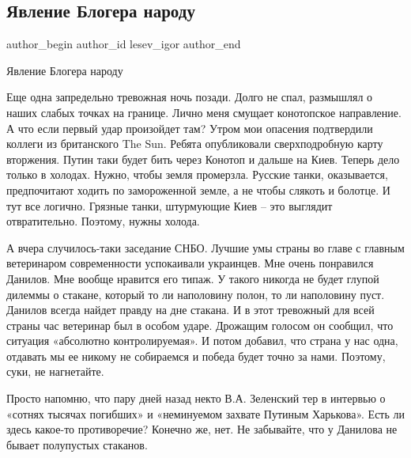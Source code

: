  
 
 
 
 
 
\subsection{Явление Блогера народу}
\label{sec:25_01_2022.tg.lesev_igor.1.javlenie_blogera_narodu}
 
\ifcmt
 author_begin
   author_id lesev_igor
 author_end
\fi

Явление Блогера народу

Еще одна запредельно тревожная ночь позади. Долго не спал, размышлял о наших
слабых точках на границе. Лично меня смущает конотопское направление. А что
если первый удар произойдет там? Утром мои опасения подтвердили коллеги из
британского The Sun. Ребята опубликовали сверхподробную карту вторжения. Путин
таки будет бить через Конотоп и дальше на Киев. Теперь дело только в холодах.
Нужно, чтобы земля промерзла. Русские танки, оказывается, предпочитают ходить
по замороженной земле, а не чтобы слякоть и болотце. И тут все логично. Грязные
танки, штурмующие Киев – это выглядит отвратительно. Поэтому, нужны холода.

А вчера случилось-таки заседание СНБО. Лучшие умы страны во главе с главным
ветеринаром современности успокаивали украинцев. Мне очень понравился Данилов.
Мне вообще нравится его типаж. У такого никогда не будет глупой дилеммы о
стакане, который то ли наполовину полон, то ли наполовину пуст. Данилов всегда
найдет правду на дне стакана. И в этот тревожный для всей страны час ветеринар
был в особом ударе. Дрожащим голосом он сообщил, что ситуация «абсолютно
контролируемая». И потом добавил, что страна у нас одна, отдавать мы ее никому
не собираемся и победа будет точно за нами. Поэтому, суки, не нагнетайте.

Просто напомню, что пару дней назад некто В.А. Зеленский тер в интервью о
«сотнях тысячах погибших» и «неминуемом захвате Путиным Харькова». Есть ли
здесь какое-то противоречие? Конечно же, нет. Не забывайте, что у Данилова не
бывает полупустых стаканов.

